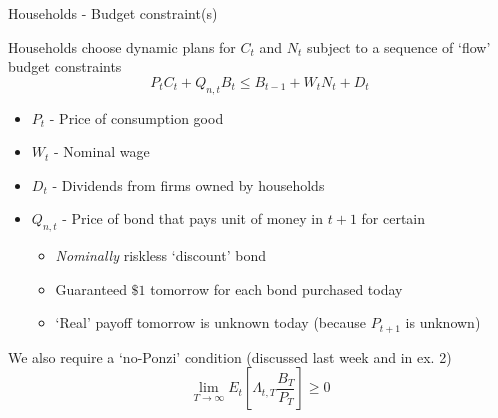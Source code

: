 \begin{frame}{Households - Budget constraint(s)}

Households choose dynamic plans for $C_{t}$ and $N_{t}$ subject to a sequence of `flow' budget constraints
\begin{equation*}
P_{t} C_{t} + Q_{n,t} B_{t} \leq B_{t-1} + W_{t} N_{t} + D_{t}
\end{equation*}

\begin{itemize}
\item 	$P_{t}$		- Price of consumption good
\item	$W_{t}$		- Nominal wage
\item	$D_{t}$		- Dividends from firms owned by households
\item	$Q_{n,t}$	- Price of bond that pays unit of money in $t+1$ for certain
	\begin{itemize}
	\item \emph{Nominally} riskless `discount' bond
	\item Guaranteed $\$1$ tomorrow for each bond purchased today
	\item `Real' payoff tomorrow is unknown today (because $P_{t+1}$ is unknown)
	\end{itemize}
\end{itemize}

\vspace{2mm}
We also require a `no-Ponzi' condition (discussed last week and in ex. 2)
\[
\lim_{T \to \infty} E_{t} \left[ \Lambda_{t,T} \frac{B_{T}}{P_{T}} \right] \geq 0
\]

\end{frame}




